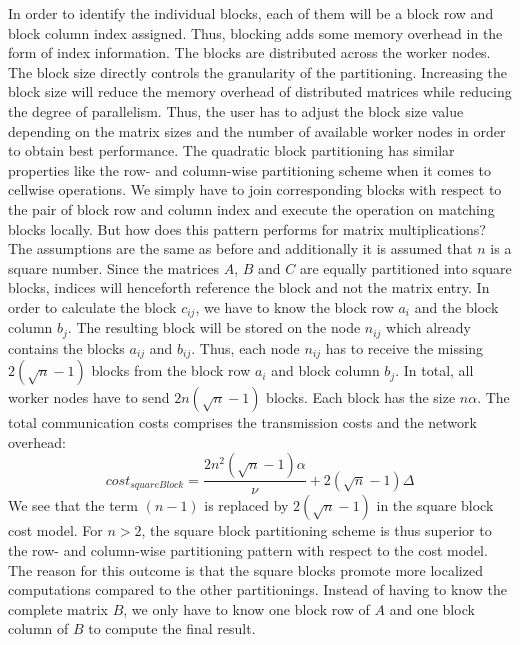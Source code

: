 In order to identify the individual blocks, each of them will be a block row and block column index assigned. 
Thus, blocking adds some memory overhead in the form of index information. 
The blocks are distributed across the worker nodes. 
The block size directly controls the granularity of the partitioning. 
Increasing the block size will reduce the memory overhead of distributed matrices while reducing the degree of parallelism. 
Thus, the user has to adjust the block size value depending on the matrix sizes and the number of available worker nodes in order to obtain best performance. 
The quadratic block partitioning has similar properties like the row- and column-wise partitioning scheme when it comes to cellwise operations. 
We simply have to join corresponding blocks with respect to the pair of block row and column index and execute the operation on matching blocks locally. 
But how does this pattern performs for matrix multiplications? 
The assumptions are the same as before and additionally it is assumed that $n$ is a square number. 
Since the matrices $A$, $B$ and $C$ are equally partitioned into square blocks, indices will henceforth reference the block and not the matrix entry. In order to calculate the block $c_{ij}$, we have to know the block row $a_{i}$ and the block column $b_{j}$. 
The resulting block will be stored on the node $n_{ij}$ which already contains the blocks $a_{ij}$ and $b_{ij}$. 
Thus, each node $n_{ij}$ has to receive the missing $2\left(\sqrt{n}-1\right)$ blocks from the block row $a_{i}$ and block column $b_{j}$. 
In total, all worker nodes have to send $2n\left(\sqrt{n}-1\right)$ blocks. 
Each block has the size $n\alpha$. 
The total communication costs comprises the transmission costs and the network overhead:
\begin{displaymath}
	cost_{squareBlock} = \frac{2n^2\left(\sqrt{n}-1\right)\alpha}{\nu} + 2\left(\sqrt{n}-1\right)\Delta
\end{displaymath}
We see that the term $(n-1)$ is replaced by $2\left(\sqrt{n}-1\right)$ in the square block cost model. 
For $n>2$, the square block partitioning scheme is thus superior to the row- and column-wise partitioning pattern with respect to the cost model. 
The reason for this outcome is that the square blocks promote more localized computations compared to the other partitionings. 
Instead of having to know the complete matrix $B$, we only have to know one block row of $A$ and one block column of $B$ to compute the final result. 

